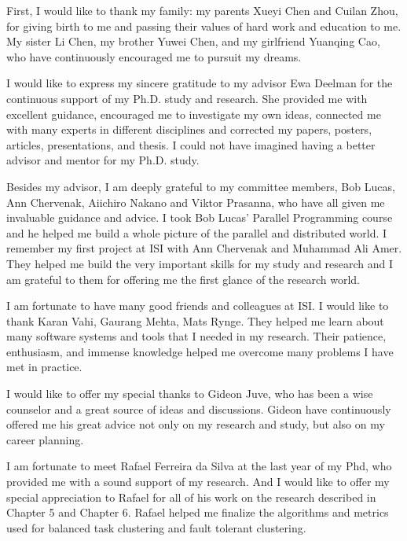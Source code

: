 
First, I would like to thank my family: my parents Xueyi Chen and Cuilan Zhou, for giving birth to me and passing their values of hard work and education to me. My sister Li Chen, my brother Yuwei Chen, and my girlfriend Yuanqing Cao, who have continuously encouraged me to pursuit my dreams. 

I would like to express my sincere gratitude to my advisor Ewa Deelman for the continuous support of my Ph.D. study and research. She provided me with excellent guidance, encouraged me to investigate my own ideas, connected me with many experts in different disciplines and corrected my papers, posters, articles, presentations, and thesis. I could not have imagined having a better advisor and mentor for my Ph.D. study. 

Besides my advisor, I am deeply grateful to my committee members, Bob Lucas, Ann Chervenak, Aiichiro Nakano and Viktor Prasanna, who have all given me invaluable guidance and advice. I took Bob Lucas' Parallel Programming course and he helped me build a whole picture of the parallel and distributed world. I remember my first project at ISI with Ann Chervenak and Muhammad Ali Amer. They helped me build the very important skills for my study and research and I am grateful to them for offering me the first glance of the research world.

I am fortunate to have many good friends and colleagues at ISI. I would like to thank Karan Vahi, Gaurang Mehta, Mats Rynge. They helped me learn about many software systems and tools that I needed in my research. Their patience, enthusiasm, and immense knowledge helped me overcome many problems I have met in practice. 

I would like to offer my special thanks to Gideon Juve, who has been a wise counselor and a great source of ideas and discussions.  Gideon have continuously offered me his great advice not only on my research and study, but also on my career planning. 

I am fortunate to meet Rafael Ferreira da Silva at the last year of my Phd, who provided me with a sound support of my research. 
And I would like to offer my special appreciation to Rafael for all of his work on the research described in Chapter 5 and Chapter 6. Rafael helped me finalize the algorithms and metrics used for balanced task clustering and fault tolerant clustering. 


